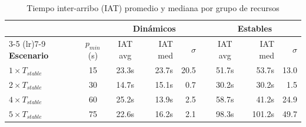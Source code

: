 \begin{table}[htbp]
\centering
\caption{Tiempo inter-arribo (IAT) promedio y mediana por grupo de recursos}
\label{tab:benchmark-v2-iat}
\begin{tabular}{lccrrccrr}
\toprule
& & \multicolumn{3}{c}{\textbf{Dinámicos}} & & \multicolumn{3}{c}{\textbf{Estables}} \\
\cmidrule(lr){3-5} \cmidrule(lr){7-9}
\textbf{Escenario} & $p_{min}$ (s) & IAT avg & IAT med & $\sigma$ & & IAT avg & IAT med & $\sigma$ \\
\midrule
$1\times T_{stable}$ & 15 & 23.3s & 23.7s & 20.5 & & 51.7s & 53.7s & 13.0 \\
$2\times T_{stable}$ & 30 & 14.7s & 15.1s & 0.7 & & 30.2s & 30.2s & 1.5 \\
$4\times T_{stable}$ & 60 & 25.2s & 13.9s & 2.5 & & 58.7s & 41.2s & 24.9 \\
$5\times T_{stable}$ & 75 & 22.6s & 16.2s & 2.1 & & 98.3s & 101.2s & 49.7 \\
\bottomrule
\end{tabular}
\end{table}
